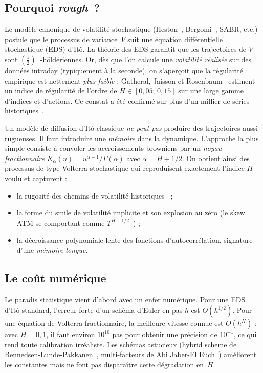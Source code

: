 \documentclass[11pt,a4paper]{article}
\theoremstyle{definition}
\newcommand{\1}{\mathbf{1}}
\begin{document}
\subsection{Pourquoi \emph{rough}~?}
Le modèle canonique de volatilité stochastique (Heston~\cite{Heston93},
Bergomi~\cite{Bergomi16}, SABR, etc.) postule que le processus de
variance~$V$ suit une équation différentielle stochastique (EDS) d'Itô. La
théorie des EDS garantit que les trajectoires de $V$ sont
$(\frac{1}{2})^{-}$-höldériennes. Or, dès que l'on calcule une \emph{volatilité
réalisée} sur des données intraday (typiquement à la seconde), on s'aperçoit que
la régularité empirique est nettement \emph{plus faible} : Gatheral, Jaisson et
Rosenbaum~\cite{GJR14} estiment un indice de régularité de l'ordre de $H \in
[0{,}05;\,0{,}15]$ sur une large gamme d'indices et d'actions. Ce constat a été
confirmé sur plus d'un millier de séries historiques~\cite{BLP17}.

Un modèle de diffusion d'Itô classique \emph{ne peut pas} produire des
trajectoires aussi rugueuses. Il faut introduire une \emph{mémoire} dans la
dynamique. L'approche la plus simple consiste à convoler les accroissements
browniens par un \emph{noyau fractionnaire}
$K_{\alpha}(u) = u^{\alpha-1}/\Gamma(\alpha)$ avec $\alpha = H+1/2$. On obtient
ainsi des processus de type Volterra stochastique qui reproduisent exactement
l'indice $H$ voulu et capturent :
\begin{itemize}[leftmargin=*,topsep=1pt,itemsep=1pt]
  \item la rugosité des chemins de volatilité historiques~\cite{GJR14} ;
  \item la forme du smile de volatilité implicite et son explosion au zéro
        (le skew ATM se comportant comme $T^{H-1/2}$~\cite{BFG16,GE22}) ;
  \item la décroissance polynomiale lente des fonctions
        d'autocorrélation, signature d'une \emph{mémoire longue}.
\end{itemize}

\subsection{Le coût numérique}
Le paradis statistique vient d'abord avec un enfer numérique. Pour une EDS
d'Itô standard, l'erreur forte d'un schéma d'Euler en pas $h$ est $O(h^{1/2})$.
Pour une équation de Volterra fractionnaire, la meilleure vitesse connue est
$O(h^H)$ : avec $H=0{,}1$, il faut environ $10^{10}$ pas pour obtenir une
précision de $10^{-1}$, ce qui rend toute calibration irréaliste. Les schémas
astucieux (hybrid scheme de Bennedsen-Lunde-Pakkanen~\cite{BLP17},
multi-facteurs de Abi Jaber-El Euch~\cite{AJE19}) améliorent les constantes mais
ne font pas disparaître cette dégradation en~$H$.
\end{document}
